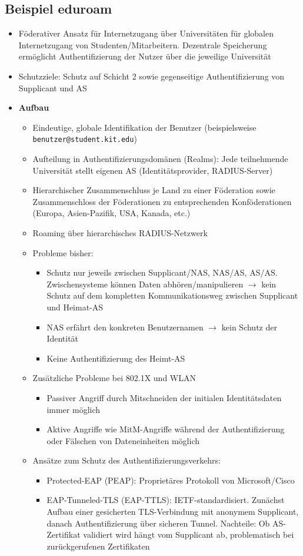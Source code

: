 \subsection{Beispiel eduroam}
\begin{itemize}
	\item Föderativer Ansatz für Internetzugang über Universitäten für globalen Internetzugang von Studenten/Mitarbeitern. Dezentrale Speicherung ermöglicht Authentifizierung der Nutzer über die jeweilige Universität
	\item Schutzziele: Schutz auf Schicht 2 sowie gegenseitige Authentifizierung von Supplicant und AS
	\item \textbf{Aufbau}
	\begin{itemize}
		\item Eindeutige, globale Identifikation der Benutzer (beispielsweise \texttt{benutzer@student.kit.edu})
		\item Aufteilung in Authentifizierungsdomänen (Realms): Jede teilnehmende Universität stellt eigenen AS (Identitätsprovider, RADIUS-Server)
		\item Hierarchischer Zusammenschluss je Land zu einer Föderation sowie Zusammenschloss der Föderationen zu entsprechenden Konföderationen (Europa, Asien-Pazifik, USA, Kanada, etc.)
		\item Roaming über hierarchisches RADIUS-Netzwerk
		\item Probleme bisher:
		\begin{itemize}
			\item Schutz nur jeweils zwischen Supplicant/NAS, NAS/AS, AS/AS. Zwischensysteme können Daten abhören/manipulieren \(\rightarrow\) kein Schutz auf dem kompletten Kommunikationsweg zwischen Supplicant und Heimat-AS
			\item NAS erfährt den konkreten Benutzernamen \(\rightarrow\) kein Schutz der Identität
			\item Keine Authentifizierung des Heimt-AS
		\end{itemize}
		\item Zusätzliche Probleme bei 802.1X und WLAN
		\begin{itemize}
			\item Passiver Angriff durch Mitschneiden der initialen Identitätsdaten immer möglich
			\item Aktive Angriffe wie MitM-Angriffe während der Authentifizierung oder Fälschen von Dateneinheiten möglich
		\end{itemize}
		\item Ansätze zum Schutz des Authentifizierungsverkehrs:
		\begin{itemize}
			\item Protected-EAP (PEAP): Proprietäres Protokoll von Microsoft/Cisco
			\item EAP-Tunneled-TLS (EAP-TTLS): IETF-standardisiert. Zunächst Aufbau einer gesicherten TLS-Verbindung mit anonymem Supplicant, danach Authentifizierung über sicheren Tunnel. Nachteile: Ob AS-Zertifikat validiert wird hängt vom Supplicant ab, problematisch bei zurückgerufenen Zertifikaten 
		\end{itemize}
	\end{itemize}
\end{itemize}



